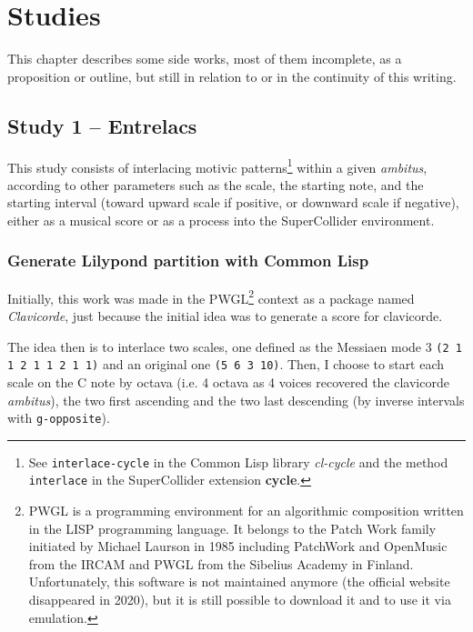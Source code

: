 \chapter*{Studies}


This chapter describes some side works, most of them incomplete, as a proposition or outline, but still in relation to or in the continuity of this writing.

\section*{Study 1 -- Entrelacs}


This study consists of interlacing motivic patterns\footnote{See \texttt{interlace-cycle} in the Common Lisp library \textit{cl-cycle} and the method \texttt{interlace} in the SuperCollider extension \textbf{cycle}.} within a given \textit{ambitus}, according to other parameters such as the scale, the starting note, and the starting interval (toward upward scale if positive, or downward scale if negative), either as a musical score or as a process into the SuperCollider environment.

\subsection*{Generate Lilypond partition with Common Lisp}

Initially, this work was made in the PWGL\footnote{PWGL is a programming environment for an algorithmic composition written in the LISP programming language. It belongs to the Patch Work family initiated by Michael Laurson in 1985 including PatchWork and OpenMusic from the IRCAM and PWGL from the Sibelius Academy in Finland. Unfortunately, this software is not maintained anymore (the official website disappeared in 2020), but it is still possible to download it and to use it via emulation.} context as a package named \textit{Clavicorde}, just because the initial idea was to generate a score for clavicorde.

The idea then is to interlace two scales, one defined as the Messiaen mode 3 \texttt{(2 1 1 2 1 1 2 1 1)} and an original one \texttt{(5 6 3 10)}. Then, I choose to start each scale on the C note by octava (i.e. 4 octava as 4 voices recovered the clavicorde \textit{ambitus}), the two first ascending and the two last descending (by inverse intervals with \texttt{g-opposite}). 

